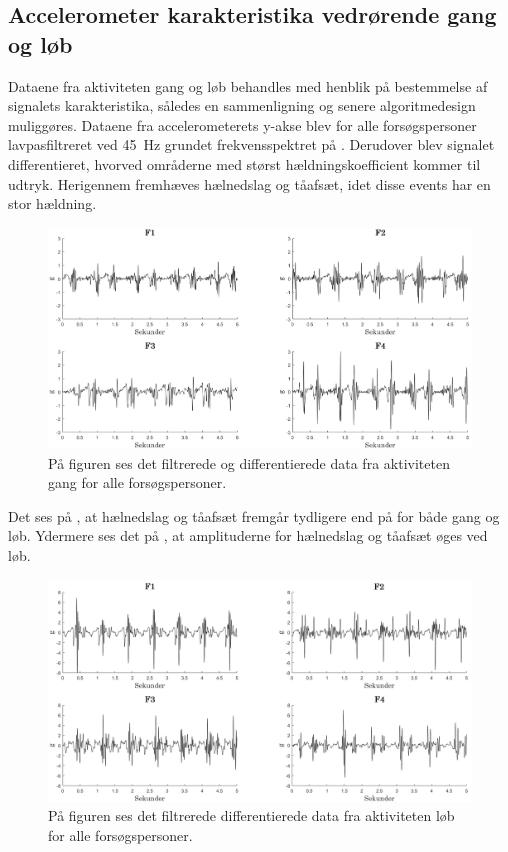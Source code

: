 \subsection{Accelerometer karakteristika vedrørende gang og løb}
Dataene fra aktiviteten gang og løb behandles med henblik på bestemmelse af signalets karakteristika, således en sammenligning og senere algoritmedesign muliggøres. Dataene fra accelerometerets y-akse blev for alle forsøgspersoner lavpasfiltreret ved 45~Hz grundet frekvensspektret på . Derudover blev signalet differentieret, hvorved områderne med størst hældningskoefficient kommer til udtryk. Herigennem fremhæves hælnedslag og tåafsæt, idet disse events har en stor hældning.
\begin{figure}[H]
	\centering
	\includegraphics[scale=0.6]{figures/qBilag/gang_diff}
	\caption{På figuren ses det filtrerede og differentierede data fra aktiviteten gang for alle forsøgspersoner.}
	\label{fig:Ap_gangdiff}
\end{figure}\vspace{-.25cm}
Det ses på , at hælnedslag og tåafsæt fremgår tydligere end på  for både gang og løb. Ydermere ses det på , at amplituderne for hælnedslag og tåafsæt øges ved løb.
\begin{figure}[H]
	\centering
	\includegraphics[scale=0.6]{figures/qBilag/loeb_diff}
	\caption{På figuren ses det filtrerede differentierede data fra aktiviteten løb for alle forsøgspersoner.}
	\label{fig:Ap_loebdiff}
\end{figure}\vspace{-.25cm}

